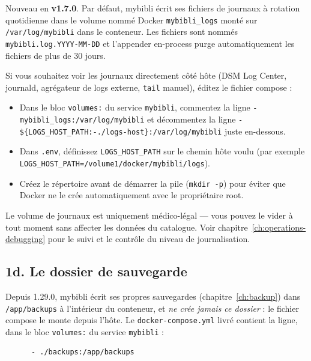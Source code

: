 Nouveau en \textbf{v1.7.0}. Par défaut, mybibli écrit ses fichiers de
journaux à rotation quotidienne dans le volume nommé Docker
\texttt{mybibli\_logs} monté sur \texttt{/var/log/mybibli} dans le
conteneur. Les fichiers sont nommés \texttt{mybibli.log.YYYY-MM-DD}
et l'appender en-process purge automatiquement les fichiers de plus
de 30 jours.

Si vous souhaitez voir les journaux directement côté hôte (DSM Log
Center, journald, agrégateur de logs externe, \texttt{tail} manuel),
éditez le fichier compose :

\begin{itemize}
  \item Dans le bloc \texttt{volumes:} du service \texttt{mybibli},
        commentez la ligne
        \texttt{- mybibli\_logs:/var/log/mybibli} et décommentez la
        ligne
        \texttt{- \$\{LOGS\_HOST\_PATH:-./logs-host\}:/var/log/mybibli}
        juste en-dessous.
  \item Dans \texttt{.env}, définissez \texttt{LOGS\_HOST\_PATH}
        sur le chemin hôte voulu (par exemple
        \texttt{LOGS\_HOST\_PATH=/volume1/docker/mybibli/logs}).
  \item Créez le répertoire avant de démarrer la pile
        (\texttt{mkdir -p}) pour éviter que Docker ne le crée
        automatiquement avec le propriétaire root.
\end{itemize}

Le volume de journaux est uniquement médico-légal — vous pouvez le
vider à tout moment sans affecter les données du catalogue. Voir
chapitre~\ref{ch:operations-debugging} pour le suivi et le contrôle
du niveau de journalisation.

\subsection*{1d. Le dossier de sauvegarde}\label{sec:install-backups}

Depuis 1.29.0, mybibli écrit ses propres sauvegardes
(chapitre~\ref{ch:backup}) dans \texttt{/app/backups} à l'intérieur du
conteneur, et \emph{ne crée jamais ce dossier} : le fichier compose le
monte depuis l'hôte. Le \texttt{docker-compose.yml} livré contient la
ligne, dans le bloc \texttt{volumes:} du service \texttt{mybibli} :

\begin{lstlisting}
      - ./backups:/app/backups
\end{lstlisting}

